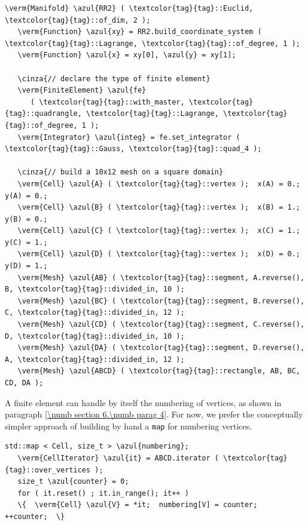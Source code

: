 \begin{Verbatim}[commandchars=\\\{\},formatcom=\small\tt,frame=single,
   label=parag-\ref{\numb section 6.\numb parag 2}.cpp,rulecolor=\color{coment},
   baselinestretch=0.94,framesep=2mm                                            ]
   \verm{Manifold} \azul{RR2} ( \textcolor{tag}{tag}::Euclid, \textcolor{tag}{tag}::of_dim, 2 );
   \verm{Function} \azul{xy} = RR2.build_coordinate_system ( \textcolor{tag}{tag}::Lagrange, \textcolor{tag}{tag}::of_degree, 1 );
   \verm{Function} \azul{x} = xy[0], \azul{y} = xy[1];

   \cinza{// declare the type of finite element}
   \verm{FiniteElement} \azul{fe}
      ( \textcolor{tag}{tag}::with_master, \textcolor{tag}{tag}::quadrangle, \textcolor{tag}{tag}::Lagrange, \textcolor{tag}{tag}::of_degree, 1 );
   \verm{Integrator} \azul{integ} = fe.set_integrator ( \textcolor{tag}{tag}::Gauss, \textcolor{tag}{tag}::quad_4 );

   \cinza{// build a 10x12 mesh on a square domain}
   \verm{Cell} \azul{A} ( \textcolor{tag}{tag}::vertex );  x(A) = 0.;   y(A) = 0.;
   \verm{Cell} \azul{B} ( \textcolor{tag}{tag}::vertex );  x(B) = 1.;   y(B) = 0.;
   \verm{Cell} \azul{C} ( \textcolor{tag}{tag}::vertex );  x(C) = 1.;   y(C) = 1.;
   \verm{Cell} \azul{D} ( \textcolor{tag}{tag}::vertex );  x(D) = 0.;   y(D) = 1.;
   \verm{Mesh} \azul{AB} ( \textcolor{tag}{tag}::segment, A.reverse(), B, \textcolor{tag}{tag}::divided_in, 10 );
   \verm{Mesh} \azul{BC} ( \textcolor{tag}{tag}::segment, B.reverse(), C, \textcolor{tag}{tag}::divided_in, 12 );
   \verm{Mesh} \azul{CD} ( \textcolor{tag}{tag}::segment, C.reverse(), D, \textcolor{tag}{tag}::divided_in, 10 );
   \verm{Mesh} \azul{DA} ( \textcolor{tag}{tag}::segment, D.reverse(), A, \textcolor{tag}{tag}::divided_in, 12 );
   \verm{Mesh} \azul{ABCD} ( \textcolor{tag}{tag}::rectangle, AB, BC, CD, DA );
\end{Verbatim}
\vskip 1mm

A finite element can handle by itself the numbering of vertices, as shown in paragraph
\ref{\numb section 6.\numb parag 4}.
For now, we prefer the conceptually simpler approach of building by hand a {\small\tt map}
for numbering vertices.
\vskip 1mm

\begin{Verbatim}[commandchars=\\\{\},formatcom=\small\tt,frame=single,
   label=parag-\ref{\numb section 6.\numb parag 2}.cpp,rulecolor=\color{coment},
   baselinestretch=0.94,framesep=2mm                                            ]
   std::map < Cell, size_t > \azul{numbering};
   \verm{CellIterator} \azul{it} = ABCD.iterator ( \textcolor{tag}{tag}::over_vertices );
   size_t \azul{counter} = 0;
   for ( it.reset() ; it.in_range(); it++ )
   \{  \verm{Cell} \azul{V} = *it;  numbering[V] = counter;  ++counter;  \}
\end{Verbatim}
\vskip 1mm

